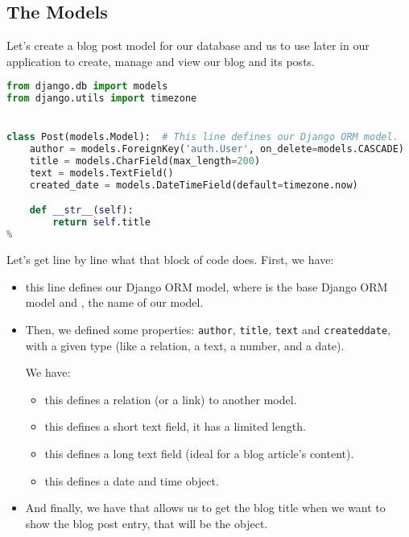  \subsection{The Models}
    Let's create a blog post model for our database and us to use later in our application
    to create, manage and view our blog and its posts.
    
    \begin{lstlisting}[language=python, title=\texttt{blog/models.py}]
from django.db import models
from django.utils import timezone


class Post(models.Model):  # This line defines our Django ORM model.
    author = models.ForeignKey('auth.User', on_delete=models.CASCADE)
    title = models.CharField(max_length=200)
    text = models.TextField()
    created_date = models.DateTimeField(default=timezone.now)

    def __str__(self):
        return self.title
%
    \end{lstlisting}

    Let's get line by line what that block of code does. First, we have:
    
    \begin{itemize}
        \item {} this line defines our Django ORM model, 
              where  is the base Django ORM model and ,
              the name of our model.
        \item Then, we defined some properties: \texttt{author}, 
            \texttt{title}, \texttt{text} and \texttt{created\textunderscore date},
            with a given type (like a relation, a text, a number, and a date).
              
            We have:
              
            \begin{itemize}
                \item {}
                    this defines a relation (or a link) to another model.
                \item {}
                    this defines a short text field, it has a limited length.
                \item {} 
                    this defines a long text field (ideal for a blog article's content).
                \item {}
                    this defines a date and time object.
            \end{itemize}
            
        \item And finally, 
        we have  that allows us to get the blog title
        when we want to show the blog post entry, that will be the  object.
    \end{itemize}
